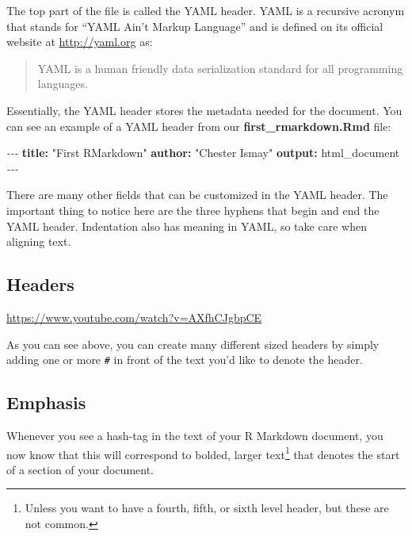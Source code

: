 \documentclass[]{tufte-book}
\newenvironment{Shaded}{\begin{snugshade}}{\end{snugshade}}
\newcommand{\AttributeTok}[1]{\textcolor[rgb]{0.13,0.29,0.53}{#1}}
\newcommand{\FunctionTok}[1]{\textcolor[rgb]{0.13,0.29,0.53}{\textbf{#1}}}
\newcommand{\KeywordTok}[1]{\textcolor[rgb]{0.13,0.29,0.53}{\textbf{#1}}}
\newcommand{\PreprocessorTok}[1]{\textcolor[rgb]{0.56,0.35,0.01}{\textit{#1}}}
\newcommand{\StringTok}[1]{\textcolor[rgb]{0.31,0.60,0.02}{#1}}
\begin{document}
The top part of the file is called the YAML header. YAML is a recursive acronym that stands for ``YAML Ain't Markup Language'' and is defined on its official website at \url{http://yaml.org} as:

\begin{quote}
YAML is a human friendly data serialization
standard for all programming languages.
\end{quote}

Essentially, the YAML header stores the metadata needed for the document. You can see an example of a YAML header from our \textbf{first\_rmarkdown.Rmd} file:

\begin{Shaded}
\begin{Highlighting}[]
\PreprocessorTok{{-}{-}{-}}
\FunctionTok{title}\KeywordTok{:}\AttributeTok{ }\StringTok{"First RMarkdown"}
\FunctionTok{author}\KeywordTok{:}\AttributeTok{ }\StringTok{"Chester Ismay"}
\FunctionTok{output}\KeywordTok{:}\AttributeTok{ html\_document}
\PreprocessorTok{{-}{-}{-}}
\end{Highlighting}
\end{Shaded}

There are many other fields that can be customized in the YAML header. The important thing to notice here are the three hyphens that begin and end the YAML header. Indentation also has meaning in YAML, so take care when aligning text.

\subsection{Headers}\label{headers}

\vspace{0.1in}\begin{center}\footnotesize{\url{https://www.youtube.com/watch?v=AXfhCJgbpCE}}\end{center}\vspace{0.1in}

As you can see above, you can create many different sized headers by simply adding one or more \texttt{\#} in front of the text you'd like to denote the header.

\subsection{Emphasis}\label{emphasis}

Whenever you see a hash-tag in the text of your R Markdown document, you now know that this will correspond to bolded, larger text\footnote{Unless you want to have a fourth, fifth, or sixth level header, but these are not common.} that denotes the start of a section of your document.
\end{document}

